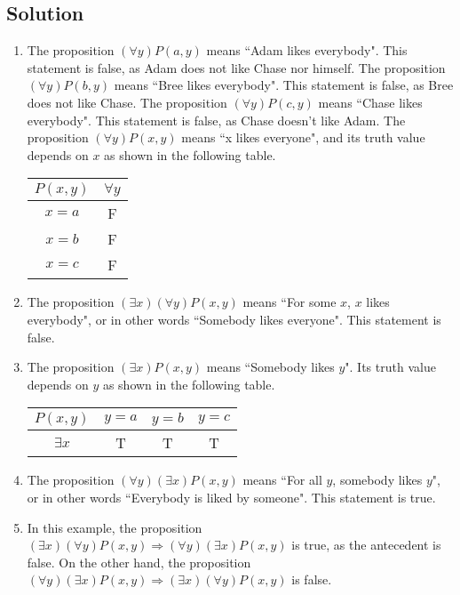 \documentclass{article}
\begin{document}
\subsection*{Solution}
    \begin{enumerate}
        \item The proposition $(\forall y)P(a, y)$ means ``Adam likes everybody". This statement is false, as Adam does not like Chase nor himself. The proposition $(\forall y)P(b, y)$ means ``Bree likes everybody". This statement is false, as Bree does not like Chase. The proposition $(\forall y)P(c, y)$ means ``Chase likes everybody". This statement is false, as Chase doesn't like Adam. The proposition $(\forall y)P(x, y)$ means ``x likes everyone", and its truth value depends on $x$ as shown in the following table.
        \begin{center}
            \begin{tabular}{|c|c|}
                \hline
                $P(x,y)$ & $\forall y$\\
                \hline
                $x = a$ & F \\
                $x = b$ & F \\
                $x = c$ & F \\
                \hline
            \end{tabular}
        \end{center}
        \item The proposition $(\exists x)(\forall y)P(x, y)$ means ``For some $x$, $x$ likes everybody", or in other words ``Somebody likes everyone". This statement is false.
        \item The proposition $(\exists x)P(x, y)$ means ``Somebody likes $y$". Its truth value depends on $y$ as shown in the following table.
        \begin{center}
            \begin{tabular}{|c|ccc|}
                \hline
                $P(x,y)$ & $y = a$ & $y = b$ & $y = c$ \\
                \hline
                $\exists x$ & T & T & T \\
                \hline
            \end{tabular}
        \end{center}
        \item The proposition $(\forall y)(\exists x)P(x, y)$ means ``For all $y$, somebody likes $y$", or in other words ``Everybody is liked by someone". This statement is true.
        \item In this example, the proposition $(\exists x)(\forall y)P(x, y) \Rightarrow (\forall y)(\exists x)P(x, y)$ is true, as the antecedent is false. On the other hand, the proposition $(\forall y)(\exists x)P(x, y) \Rightarrow (\exists x)(\forall y)P(x, y)$ is false.
    \end{enumerate}
\end{document}
